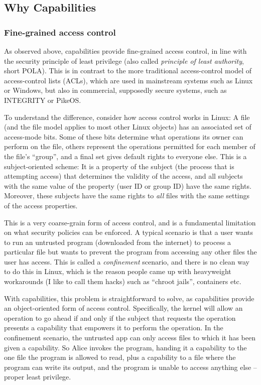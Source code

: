 \documentclass[english,a4paper,12pt\ifDraft,draft\fi]{report}
\newcommand{\SSect}[1]{\subsection{#1}}
\newcommand{\SSSect}[1]{\subsubsection*{#1}}
\newcommand{\SSect}[1]{\section{#1}}
\newcommand{\SSSect}[1]{\subsection*{#1}}
\begin{document}
  \SSect{Why Capabilities}

  \SSSect{Fine-grained access control}

  As observed above, capabilities provide fine-grained access control,
  in line with the security principle of least privilege (also called
  \emph{principle of least authority}, short POLA). This is in contrast to
  the more traditional access-control model of access-control lists
  (ACLs), which are used in mainstream systems such as Linux or
  Windows, but also in commercial, supposedly secure systems, such as
  INTEGRITY or PikeOS.

  To understand the difference, consider how access control works in
  Linux: A file (and the file model applies to most other Linux
  objects) has an associated set of access-mode bits. Some of these
  bits determine what operations its owner can perform on the file,
  others represent the operations permitted for each member of the file's
  ``group'', and a final set gives default rights to everyone
  else. This is a subject-oriented scheme: It is a property of the
  subject (the process that is attempting access) that determines the
  validity of the access, and all subjects with the same value of the
  property (user ID or group ID) have the same rights. Moreover, these
  subjects have the same rights to \emph{all} files with the same
  settings of the access properties.

  This is a very coarse-grain form of access control, and is a
  fundamental limitation on what security policies can be enforced. A
  typical scenario is that a user wants to run an untrusted program
  (downloaded from the internet) to process a particular file but
  wants to prevent the program from accessing any other files the user
  has access. This is called a \emph{confinement} scenario, and there
  is no clean way to do this in Linux, which is the reason people came
  up with heavyweight workarounds (I like to call them hacks) such as
  ``chroot jails'', containers etc.

  With capabilities, this problem is straightforward to solve, as
  capabilities provide an object-oriented form of access
  control. Specifically, the kernel will allow an operation to go
  ahead if and only if the subject that requests the operation
  presents a capability that empowers it to perform the operation. In the
  confinement scenario, the untrusted app can only access files to
  which it has been given a capability. So Alice invokes the
  program, handing it a capability to the one file the program is
  allowed to read, plus a capability to a file where the
  program can write its output, and the program is unable to access
  anything else -- proper least privilege.
\end{document}
